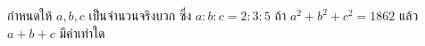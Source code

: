 ﻿%
\question กำหนดให้ $a, b, c$ เป็นจำนวนจริงบวก ซึ่ง $a:b:c = 2:3:5$ ถ้า $a^2+b^2+c^2=1862$ แล้ว $a+b+c$ มีค่าเท่าใด
\newline
{}

